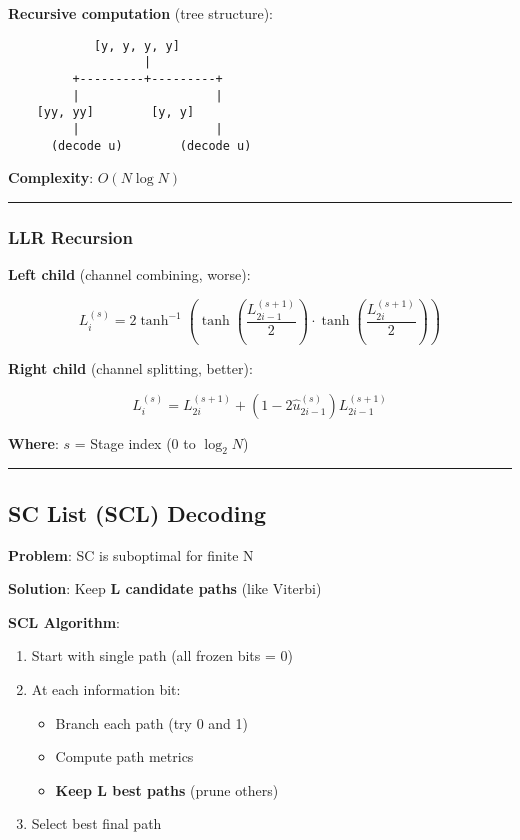 \textbf{Recursive computation} (tree structure):

\begin{verbatim}
            [y, y, y, y]
                   |
         +---------+---------+
         |                   |
    [yy, yy]        [y, y]
         |                   |
      (decode u)        (decode u)
\end{verbatim}

\textbf{Complexity}: \(O(N \log N)\)

\begin{center}\rule{0.5\linewidth}{0.5pt}\end{center}

\subsubsection{LLR Recursion}\label{llr-recursion}

\textbf{Left child} (channel combining, worse):

\[
L_i^{(s)} = 2 \tanh^{-1}\left(\tanh\left(\frac{L_{2i-1}^{(s+1)}}{2}\right) \cdot \tanh\left(\frac{L_{2i}^{(s+1)}}{2}\right)\right)
\]

\textbf{Right child} (channel splitting, better):

\[
L_i^{(s)} = L_{2i}^{(s+1)} + (1 - 2\hat{u}_{2i-1}^{(s)}) L_{2i-1}^{(s+1)}
\]

\textbf{Where}: \(s\) = Stage index (0 to \(\log_2 N\))

\begin{center}\rule{0.5\linewidth}{0.5pt}\end{center}

\subsection{SC List (SCL) Decoding}\label{sc-list-scl-decoding}

\textbf{Problem}: SC is suboptimal for finite N

\textbf{Solution}: Keep \textbf{L candidate paths} (like Viterbi)

\textbf{SCL Algorithm}:

\begin{enumerate}
\def\labelenumi{\arabic{enumi}.}
\tightlist
\item
  Start with single path (all frozen bits = 0)
\item
  At each information bit:

  \begin{itemize}
  \tightlist
  \item
    Branch each path (try 0 and 1)
  \item
    Compute path metrics
  \item
    \textbf{Keep L best paths} (prune others)
  \end{itemize}
\item
  Select best final path
\end{enumerate}

